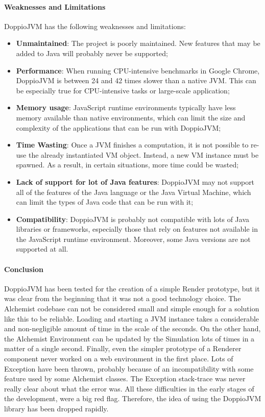 \paragraph{Weaknesses and Limitations} DoppioJVM has the following weaknesses and limitations:
\begin{itemize}
	\item \textbf{Unmaintained}: The project is poorly maintained. New features that may be added to Java will probably never be supported;
	\item \textbf{Performance}: When running CPU-intensive benchmarks in Google Chrome, DoppioJVM is between 24 and 42 times slower than a native JVM. This can be especially true for CPU-intensive tasks or large-scale application;
	\item \textbf{Memory usage}: JavaScript runtime environments typically have less memory available than native environments, which can limit the size and complexity of the applications that can be run with DoppioJVM;
	\item \textbf{Time Wasting}: Once a JVM finishes a computation, it is not possible to re-use the already instantiated VM object. Instead, a new VM instance must be spawned. As a result, in certain situations, more time could be wasted;
	\item \textbf{Lack of support for lot of Java features}: DoppioJVM may not support all of the features of the Java language or the Java Virtual Machine, which can limit the types of Java code that can be run with it;
	\item \textbf{Compatibility}: DoppioJVM is probably not compatible with lots of Java libraries or frameworks, especially those that rely on features not available in the JavaScript runtime environment. Moreover, some Java versions are not supported at all.
\end{itemize}
\paragraph{Conclusion} DoppioJVM has been tested for the creation of a simple Render prototype, but it was clear from the beginning that it was not a good technology choice. The Alchemist codebase can not be considered small and simple enough for a solution like this to be reliable. Loading and starting a JVM instance takes a considerable and non-negligible amount of time in the scale of the seconds. On the other hand, the Alchemist Environment can be updated by the Simulation lots of times in a matter of a single second.
Finally, even the simpler prototype of a Renderer component never worked on a web environment in the first place. Lots of Exception have been thrown, probably because of an incompatibility with some feature used by some Alchemist classes. The Exception stack-trace was never really clear about what the error was. All these difficulties in the early stages of the development, were a big red flag. Therefore, the idea of using the DoppioJVM library has been dropped rapidly.

